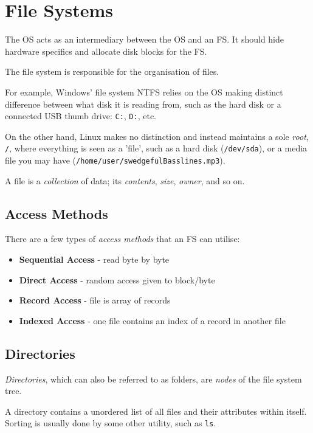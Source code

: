 \documentclass[a4]{article}
\begin{document}
\section{File Systems}

The OS acts as an intermediary between the OS and an FS. It should hide hardware specifics and allocate disk blocks for the FS.

The file system is responsible for the organisation of files.

For example, Windows' file system NTFS relies on the OS making distinct difference between what disk it is reading from, such as the hard disk or a connected USB thumb drive: \texttt{C:}, \texttt{D:}, etc.

On the other hand, Linux makes no distinction and instead maintains a sole \textit{root}, \texttt{/}, where everything is seen as a 'file', such as a hard disk (\texttt{/dev/sda}), or a media file you may have (\texttt{/home/user/swedgefulBasslines.mp3}).

A file is a \textit{collection} of data; its \textit{contents}, \textit{size}, \textit{owner}, and so on.

\subsection{Access Methods}

There are a few types of \textit{access methods} that an FS can utilise:

\begin{itemize}
\item
  \textbf{Sequential Access} - read byte by byte
\item
  \textbf{Direct Access} - random access given to block/byte
\item
  \textbf{Record Access} - file is array of records
\item
  \textbf{Indexed Access} - one file contains an index of a record in another file
\end{itemize}

\subsection{Directories}

\textit{Directories}, which can also be referred to as folders, are \textit{nodes} of the file system tree.

A directory contains a unordered list of all files and their attributes within itself. Sorting is usually done by some other utility, such as \texttt{ls}.
\end{document}
